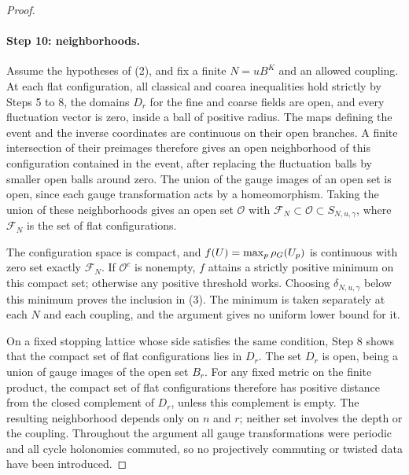 \begin{proof}
\paragraph{Step 10: neighborhoods.}
Assume the hypotheses of (2), and fix a finite $N=uB^K$ and an allowed coupling. At each flat configuration, all classical and coarea inequalities hold strictly by Steps 5 to 8, the domains $D_r$ for the fine and coarse fields are open, and every fluctuation vector is zero, inside a ball of positive radius. The maps defining the event and the inverse coordinates are continuous on their open branches. A finite intersection of their preimages therefore gives an open neighborhood of this configuration contained in the event, after replacing the fluctuation balls by smaller open balls around zero. The union of the gauge images of an open set is open, since each gauge transformation acts by a homeomorphism. Taking the union of these neighborhoods gives an open set $\mathcal O$ with $\mathcal F_N\subset\mathcal O\subset S_{N,u,\gamma}$, where $\mathcal F_N$ is the set of flat configurations.

The configuration space is compact, and $f(U)=\max_p\rho_G(U_p)$ is continuous with zero set exactly $\mathcal F_N$. If $\mathcal O^c$ is nonempty, $f$ attains a strictly positive minimum on this compact set; otherwise any positive threshold works. Choosing $\delta_{N,u,\gamma}$ below this minimum proves the inclusion in (3). The minimum is taken separately at each $N$ and each coupling, and the argument gives no uniform lower bound for it.

On a fixed stopping lattice whose side satisfies the same condition, Step 8 shows that the compact set of flat configurations lies in $D_r$. The set $D_r$ is open, being a union of gauge images of the open set $B_r$. For any fixed metric on the finite product, the compact set of flat configurations therefore has positive distance from the closed complement of $D_r$, unless this complement is empty. The resulting neighborhood depends only on $n$ and $r$; neither set involves the depth or the coupling. Throughout the argument all gauge transformations were periodic and all cycle holonomies commuted, so no projectively commuting or twisted data have been introduced.
\end{proof}
